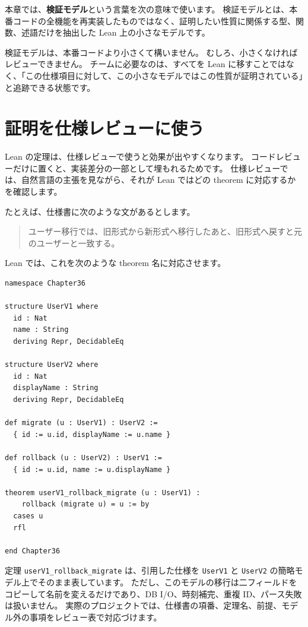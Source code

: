 本章では、\textbf{検証モデル}という言葉を次の意味で使います。
検証モデルとは、本番コードの全機能を再実装したものではなく、証明したい性質に関係する型、関数、述語だけを抽出した Lean 上の小さなモデルです。

検証モデルは、本番コードより小さくて構いません。
むしろ、小さくなければレビューできません。
チームに必要なのは、すべてを Lean に移すことではなく、「この仕様項目に対して、この小さなモデルではこの性質が証明されている」と追跡できる状態です。

\section{証明を仕様レビューに使う}

Lean の定理は、仕様レビューで使うと効果が出やすくなります。
コードレビューだけに置くと、実装差分の一部として埋もれるためです。
仕様レビューでは、自然言語の主張を見ながら、それが Lean ではどの theorem に対応するかを確認します。

たとえば、仕様書に次のような文があるとします。

\begin{quote}
ユーザー移行では、旧形式から新形式へ移行したあと、旧形式へ戻すと元のユーザーと一致する。
\end{quote}

Lean では、これを次のような theorem 名に対応させます。

\begin{listing}[htbp]
\begin{verbatim}
namespace Chapter36

structure UserV1 where
  id : Nat
  name : String
  deriving Repr, DecidableEq

structure UserV2 where
  id : Nat
  displayName : String
  deriving Repr, DecidableEq

def migrate (u : UserV1) : UserV2 :=
  { id := u.id, displayName := u.name }

def rollback (u : UserV2) : UserV1 :=
  { id := u.id, name := u.displayName }

theorem userV1_rollback_migrate (u : UserV1) :
    rollback (migrate u) = u := by
  cases u
  rfl

end Chapter36
\end{verbatim}
\caption{\texttt{userV1\_rollback\_migrate}}
\label{lst:ch36-spec-link}
\end{listing}

定理 \texttt{userV1\_rollback\_migrate} は、引用した仕様を \texttt{UserV1} と \texttt{UserV2} の簡略モデル上でそのまま表しています。
ただし、このモデルの移行は二フィールドをコピーして名前を変えるだけであり、DB I/O、時刻補完、重複 ID、パース失敗は扱いません。
実際のプロジェクトでは、仕様書の項番、定理名、前提、モデル外の事項をレビュー表で対応づけます。

